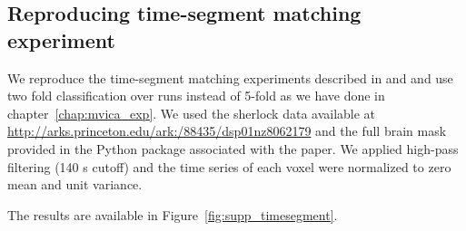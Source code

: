 



\subsection{Reproducing time-segment matching experiment}
\label{appendix_reproduce}
We reproduce the time-segment matching experiments described in \cite{chen2016convolutional} and \cite{zhang2016searchlight} and use two fold classification over runs instead of 5-fold as we have done in chapter~\ref{chap:mvica_exp}. We used the sherlock data available at \url{http://arks.princeton.edu/ark:/88435/dsp01nz8062179} and the full brain mask provided in the Python package associated with the paper. We applied high-pass filtering (140 s cutoff) and the time series of each voxel were normalized to zero mean and unit variance.

The results are available in Figure~\ref{fig:supp_timesegment}.

